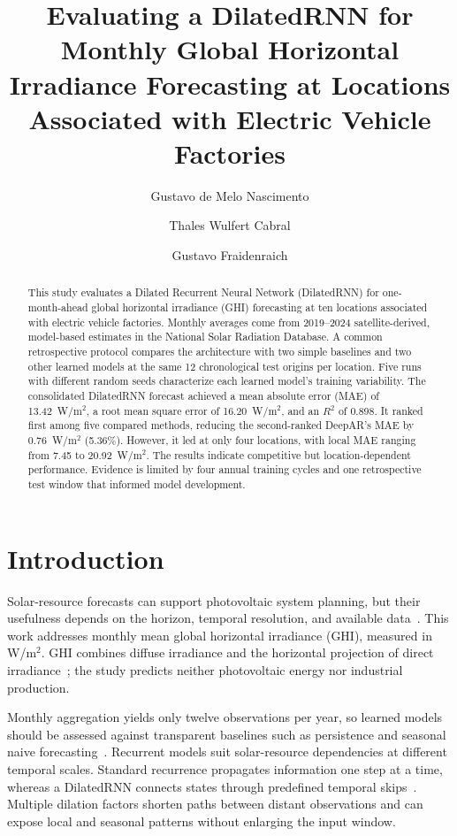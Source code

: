 \documentclass[runningheads]{llncs}
\title{Evaluating a DilatedRNN for Monthly Global Horizontal Irradiance Forecasting at Locations Associated with Electric Vehicle Factories}
\author{Gustavo de Melo Nascimento\inst{1} \and
Thales Wulfert Cabral\inst{1} \and
Gustavo Fraidenraich\inst{1}}
\institute{School of Electrical and Computer Engineering, University of Campinas (UNICAMP), Campinas, SP, Brazil\\
\email{\{g239679,t264377\}@dac.unicamp.br, gfraiden@unicamp.br}}
\begin{document}
\raggedbottom

\maketitle

\begin{abstract}
This study evaluates a Dilated Recurrent Neural Network (DilatedRNN) for one-month-ahead global horizontal irradiance (GHI) forecasting at ten locations associated with electric vehicle factories. Monthly averages come from 2019--2024 satellite-derived, model-based estimates in the National Solar Radiation Database. A common retrospective protocol compares the architecture with two simple baselines and two other learned models at the same 12 chronological test origins per location. Five runs with different random seeds characterize each learned model's training variability. The consolidated DilatedRNN forecast achieved a mean absolute error (MAE) of 13.42~W/m$^2$, a root mean square error of 16.20~W/m$^2$, and an $R^2$ of 0.898. It ranked first among five compared methods, reducing the second-ranked DeepAR's MAE by 0.76~W/m$^2$ (5.36\%). However, it led at only four locations, with local MAE ranging from 7.45 to 20.92~W/m$^2$. The results indicate competitive but location-dependent performance. Evidence is limited by four annual training cycles and one retrospective test window that informed model development.

\end{abstract}

\section{Introduction}
\label{sec:introduction}

Solar-resource forecasts can support photovoltaic system planning, but their usefulness depends on the horizon, temporal resolution, and available data~\cite{voyant2017}. This work addresses monthly mean global horizontal irradiance (GHI), measured in W/m$^2$. GHI combines diffuse irradiance and the horizontal projection of direct irradiance~\cite{sengupta2018}; the study predicts neither photovoltaic energy nor industrial production.

Monthly aggregation yields only twelve observations per year, so learned models should be assessed against transparent baselines such as persistence and seasonal naive forecasting~\cite{voyant2022}. Recurrent models suit solar-resource dependencies at different temporal scales. Standard recurrence propagates information one step at a time, whereas a DilatedRNN connects states through predefined temporal skips~\cite{chang2017}. Multiple dilation factors shorten paths between distant observations and can expose local and seasonal patterns without enlarging the input window.
\end{document}

